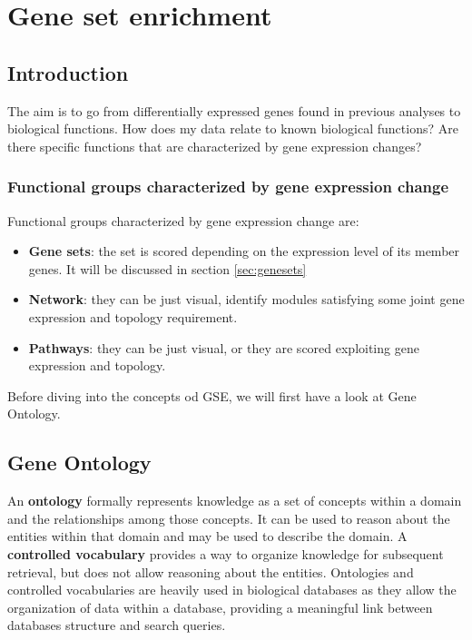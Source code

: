 \graphicspath{{chapters/06/images6/}}
\chapter{Gene set enrichment}
	\section{Introduction}
	The aim is to go from differentially expressed genes found in previous analyses to biological functions. How does my data relate to known biological functions? Are there specific functions that are characterized by gene expression changes?

	\subsection{Functional groups characterized by gene expression change}
	Functional groups characterized by gene expression change are:

	
		\begin{itemize}
			\item \textbf{Gene sets}: the set is scored depending on the expression level of its member genes. It will be discussed in section \ref{sec:genesets}
			\item \textbf{Network}: they can be just visual, identify modules satisfying some joint gene expression and topology requirement.
			\item \textbf{Pathways}: they can be just visual, or they are scored exploiting gene expression and topology.
		\end{itemize}

Before diving into the concepts od GSE, we will first have a look at Gene Ontology.
	



	\section{Gene Ontology}
	An \textbf{ontology} formally represents knowledge as a set of concepts within a domain and the relationships among those concepts.
	It can be used to reason about the entities within that domain and may be used to describe the domain.
	A \textbf{controlled vocabulary} provides a way to organize knowledge for subsequent retrieval, but does not allow reasoning about the entities.
Ontologies and controlled vocabularies are heavily used in biological databases as they allow the organization of data within a database, providing a meaningful link between databases structure and search queries.

